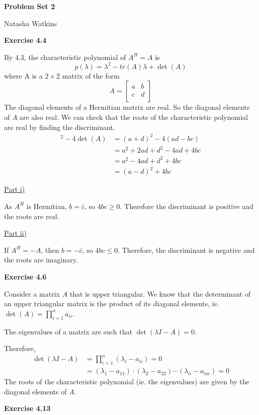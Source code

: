 \documentclass[letterpaper,12pt]{article}
\begin{document}
\textbf{\large Problem Set 2}

Natasha Watkins

\vspace{5mm}

\textbf{Exercise 4.4}

By 4.3, the characteristic polynomial of $A^H = A$ is
$$
p(\lambda) = \lambda^2 - tr(A) \lambda + \det(A)
$$
where A is a $2 \times 2$ matrix of the form
$$
A =
\begin{bmatrix}
a & b \\
c & d \\
\end{bmatrix}
$$
The diagonal elements of a Hermitian matrix are real. So the diagonal elements of $A$ are also real. We can check that the roots of the characteristic polynomial are real by finding the discriminant.
\begin{align*}
[tr(A)]^2 - 4 \det(A) &= (a + d)^2 - 4 (ad - bc) \\
&= a^2 + 2ad + d^2 -4ad + 4bc \\
&= a^2 - 4ad + d^2 + 4bc \\
&= (a - d)^2 + 4bc
\end{align*}

\underline{Part i)}

As $A^H$ is Hermitian, $b = \bar{c}$, so $4bc \geq 0$. Therefore the discriminant is positive and the roots are real.

\underline{Part ii)}

If $A^H = -A$, then $b = -\bar{c}$, so $4bc \leq 0$. Therefore, the discriminant is negative and the roots are imaginary.

\textbf{Exercise 4.6}

Consider a matrix $A$ that is upper triangular. We know that the determinant of an upper triangular matrix is the product of its diagonal elements, ie. $\det(A) = \prod_{i=1}^n a_{ii}$.

The eigenvalues of a matrix are such that $\det(\lambda I - A) = 0$.

Therefore, 
\begin{align*}
\det(\lambda I - A) &= \prod_{i=1}^n (\lambda_i - a_{ii}) = 0 \\
&= (\lambda_1 - a_{11}) \cdot (\lambda_2 - a_{22}) \cdots (\lambda_n - a_{nn}) = 0
\end{align*}
The roots of the characteristic polynomial (ie. the eigenvalues) are given by the diagonal elements of $A$.

\textbf{Exercise 4.13}
\end{document}
